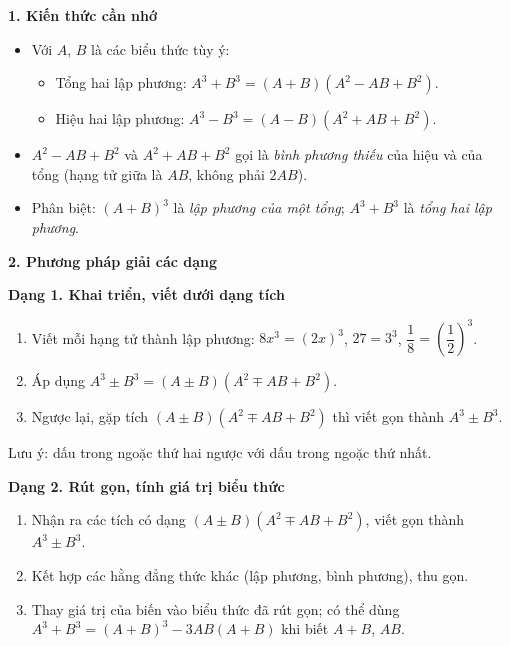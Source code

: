 \textbf{1. Kiến thức cần nhớ}
\begin{itemize}
\item Với $A$, $B$ là các biểu thức tùy ý:
\begin{itemize}
\item Tổng hai lập phương: $\boxed{A^3+B^3=(A+B)\left(A^2-AB+B^2\right)}$.
\item Hiệu hai lập phương: $\boxed{A^3-B^3=(A-B)\left(A^2+AB+B^2\right)}$.
\end{itemize}
\item $A^2-AB+B^2$ và $A^2+AB+B^2$ gọi là \textit{bình phương thiếu} của hiệu và của tổng (hạng tử giữa là $AB$, không phải $2AB$).
\item Phân biệt: $(A+B)^3$ là \textit{lập phương của một tổng}; $A^3+B^3$ là \textit{tổng hai lập phương}.
\end{itemize}

\textbf{2. Phương pháp giải các dạng}

\textbf{Dạng 1. Khai triển, viết dưới dạng tích}
\begin{enumerate}
\item Viết mỗi hạng tử thành lập phương: $8x^3=(2x)^3$, $27=3^3$, $\dfrac18=\left(\dfrac12\right)^3$.
\item Áp dụng $A^3\pm B^3=(A\pm B)\left(A^2\mp AB+B^2\right)$.
\item Ngược lại, gặp tích $(A\pm B)(A^2\mp AB+B^2)$ thì viết gọn thành $A^3\pm B^3$.
\end{enumerate}
Lưu ý: dấu trong ngoặc thứ hai ngược với dấu trong ngoặc thứ nhất.

\textbf{Dạng 2. Rút gọn, tính giá trị biểu thức}
\begin{enumerate}
\item Nhận ra các tích có dạng $(A\pm B)(A^2\mp AB+B^2)$, viết gọn thành $A^3\pm B^3$.
\item Kết hợp các hằng đẳng thức khác (lập phương, bình phương), thu gọn.
\item Thay giá trị của biến vào biểu thức đã rút gọn; có thể dùng $A^3+B^3=(A+B)^3-3AB(A+B)$ khi biết $A+B$, $AB$.
\end{enumerate}
